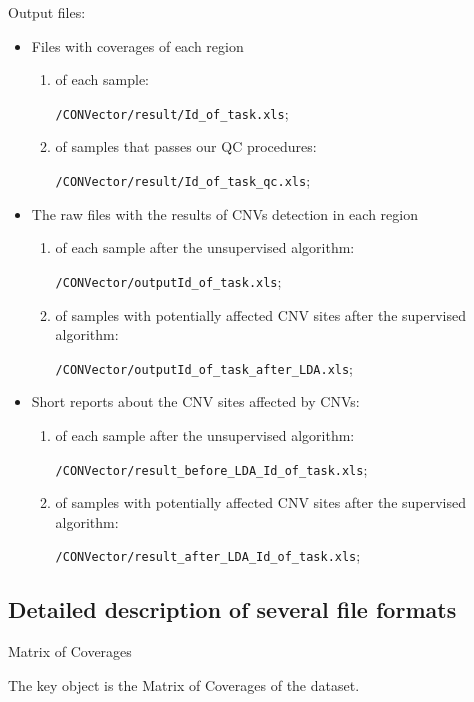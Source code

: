 \documentclass{article}
\begin{document}
\hfill \break





{\Large Output files:}
\begin{itemize}
\item Files with coverages of each region 
      \begin{enumerate}
      \item of each sample: 
      
      \texttt{/CONVector/result/Id\_of\_task.xls};
      \item of samples that passes our QC procedures: 
      
      \texttt{/CONVector/result/Id\_of\_task\_qc.xls};
      \end{enumerate}
\item The raw files with the results of CNVs detection in each region
      \begin{enumerate}
      \item of each sample after the unsupervised algorithm: 
      
      \texttt{/CONVector/outputId\_of\_task.xls};
      \item of samples with potentially affected CNV sites after the supervised algorithm: 
      
      \texttt{/CONVector/outputId\_of\_task\_after\_LDA.xls};
      \end{enumerate}
\item Short reports about the CNV sites affected by CNVs:
      \begin{enumerate}
      \item of each sample after the unsupervised algorithm: 
      
      \texttt{/CONVector/result\_before\_LDA\_Id\_of\_task.xls};
      \item of samples with potentially affected CNV sites after the supervised algorithm: 
     
      \texttt{/CONVector/result\_after\_LDA\_Id\_of\_task.xls};
      \end{enumerate}
\end{itemize}


\subsection{Detailed description of several file formats}

{\Large Matrix of Coverages}

The key object is the Matrix of Coverages of the dataset.
\end{document}
